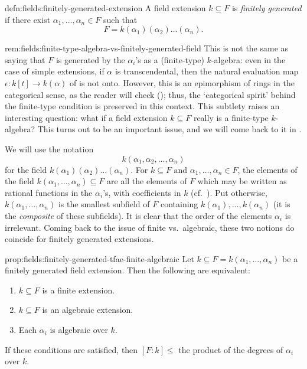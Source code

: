 \begin{defn}{}{defn:fields:finitely-generated-extension}
  A field extension $k \subseteq F$ is \emph{finitely generated} if
  there exist $\alpha_1, \dots, \alpha_n \in F$ such that
  \[
    F = k(\alpha_1)(\alpha_2)\dots(\alpha_n).
  \]
\end{defn}
\begin{rem}{}{rem:fields:finite-type-algebra-vs-finitely-generated-field}
  This is not the same as saying that $F$ is generated by the
  $\alpha_i$'s as a (finite-type) $k$-algebra: even in the case of
  simple extensions, if $\alpha$ is transcendental, then the natural
  evaluation map $\epsilon : k[t] \to k(\alpha)$ of
   is not onto. However, this is an epimorphism
  of rings in the categorical sense, as the reader will check
  (); thus, the
  `categorical spirit' behind the finite-type condition is preserved
  in this context.  This subtlety raises an interesting question: what
  if a field extension $k \subseteq F$ really is a finite-type
  $k$-algebra? This turns out to be an important issue, and we will
  come back to it in .
\end{rem}
We will use the notation
\[
  k(\alpha_1, \alpha_2, \dots, \alpha_n)
\]
for the field $k(\alpha_1)(\alpha_2)\dots(\alpha_n)$. For
$k \subseteq F$ and $\alpha_1, \dots, \alpha_n \in F$, the elements of
the field $k(\alpha_1, \dots, \alpha_n) \subseteq F$ are all the elements of
$F$ which may be written as rational functions in the $\alpha_i$'s,
with coefficients in $k$ (cf.\
). Put otherwise,
$k(\alpha_1, \dots, \alpha_n)$ is the smallest subfield of $F$
containing $k(\alpha_1), \dots, k(\alpha_n)$ (it is the
\emph{composite} of these subfields). It is clear that the order of
the elements $\alpha_i$ is irrelevant.  Coming back to the issue of
finite vs.\ algebraic, these two notions do coincide for finitely
generated extensions.
\begin{prop}{}{prop:fields:finitely-generated-tfae-finite-algebraic}
  Let $k \subseteq F = k(\alpha_1, \dots, \alpha_n)$ be a finitely
  generated field extension. Then the following are equivalent:
  \begin{enumerate}[label=(\roman*)]
  \item $k \subseteq F$ is a finite extension.
  \item $k \subseteq F$ is an algebraic extension.
  \item Each $\alpha_i$ is algebraic over $k$.
  \end{enumerate}
  If these conditions are satisfied, then $[F : k] \leq$ the product
  of the degrees of $\alpha_i$ over $k$.
\end{prop}
